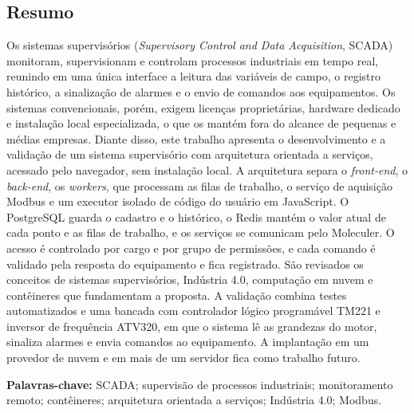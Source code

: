 \newpage %
\thispagestyle{empty} %
\clearpage %

\begin{center}
    \section*{Resumo} %
\end{center}

\par Os sistemas supervisórios (\emph{Supervisory Control and Data Acquisition}, SCADA) monitoram, supervisionam e controlam processos industriais em tempo real, reunindo em uma única interface a leitura das variáveis de campo, o registro histórico, a sinalização de alarmes e o envio de comandos aos equipamentos. Os sistemas convencionais, porém, exigem licenças proprietárias, hardware dedicado e instalação local especializada, o que os mantém fora do alcance de pequenas e médias empresas. Diante disso, este trabalho apresenta o desenvolvimento e a validação de um sistema supervisório com arquitetura orientada a serviços, acessado pelo navegador, sem instalação local. A arquitetura separa o \emph{front-end}, o \emph{back-end}, os \emph{workers}, que processam as filas de trabalho, o serviço de aquisição Modbus e um executor isolado de código do usuário em JavaScript. O PostgreSQL guarda o cadastro e o histórico, o Redis mantém o valor atual de cada ponto e as filas de trabalho, e os serviços se comunicam pelo Moleculer. O acesso é controlado por cargo e por grupo de permissões, e cada comando é validado pela resposta do equipamento e fica registrado. São revisados os conceitos de sistemas supervisórios, Indústria 4.0, computação em nuvem e contêineres que fundamentam a proposta. A validação combina testes automatizados e uma bancada com controlador lógico programável TM221 e inversor de frequência ATV320, em que o sistema lê as grandezas do motor, sinaliza alarmes e envia comandos ao equipamento. A implantação em um provedor de nuvem e em mais de um servidor fica como trabalho futuro.

\leavevmode\newline
\par\textbf{Palavras-chave:} SCADA; supervisão de processos industriais; monitoramento remoto; contêineres; arquitetura orientada a serviços; Indústria 4.0; Modbus. %

\thispagestyle{empty} %
\clearpage %
